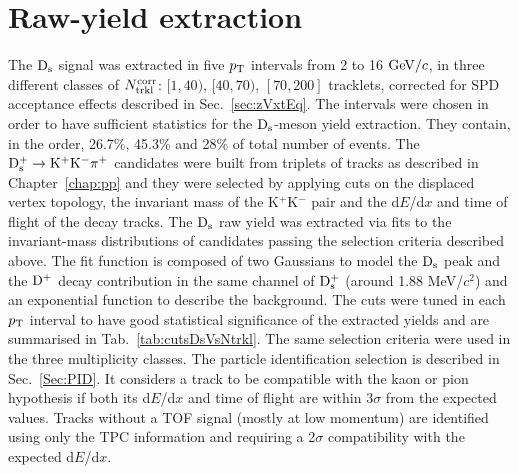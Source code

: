 \section {Raw-yield extraction}
\label{sec:Rawyields_vs_mult}
The ${\rm D_s}$ signal was extracted in five $p_{\rm T}$ intervals from 2 to 16 $\mathrm{GeV}/c$, 
in three different classes of $N_{\rm trkl}^{\rm corr}$: $[1,40)$, $[40,70)$, $[70,200]$ tracklets,
corrected for SPD acceptance effects described in Sec.~\ref{sec:zVxtEq}.
The intervals were chosen in order to have sufficient statistics for the ${\rm D_s}$-meson yield extraction.
They contain, in the order, 26.7\%, 45.3\% and 28\% of total number of events.
The ${\rm D^{+}_\mathrm{s}\to K^+ K^-\pi^+}$ candidates were built from triplets of tracks as described in Chapter~\ref{chap:pp}
and they were selected by applying cuts on the displaced vertex topology, the
invariant mass of the K$^+$K$^-$ pair and the d$E$/d$x$ and time of flight of the decay tracks.
The ${\rm D_s}$ raw yield was extracted via fits to the invariant-mass distributions of candidates passing the
selection criteria described above. The fit function is composed of two Gaussians to model
the ${\rm D_s}$ peak and the ${\rm D^+}$ decay contribution in the same channel of ${\rm D_s^+}$ (around 1.88 MeV/$c^2$) 
and an exponential function to describe the background.
The cuts were tuned in each $p_{\rm T}$ interval to have good statistical significance of the extracted yields
and are summarised in Tab.~\ref{tab:cutsDsVsNtrkl}. The same selection criteria
were used in the three multiplicity classes. The particle identification selection is described in Sec.~\ref{Sec:PID}. 
It considers a track to be compatible with the kaon or pion hypothesis if both its d$E$/d$x$ and time of flight 
are within 3$\sigma$ from the expected values. Tracks without a TOF signal 
(mostly at low momentum) are identified using only the TPC information and requiring a 2$\sigma$ 
compatibility with the expected d$E$/d$x$. 
